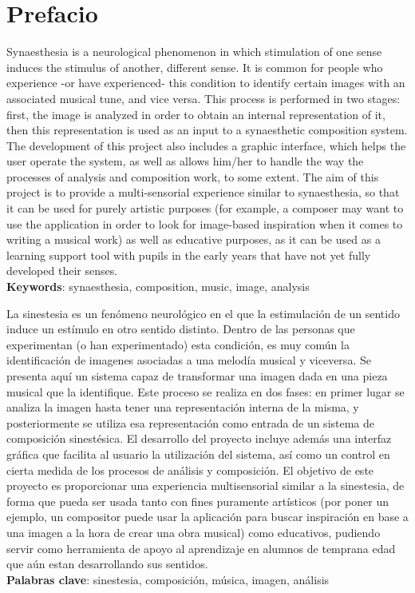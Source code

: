 \chapter*{Prefacio}

\small

Synaesthesia is a neurological phenomenon in which stimulation of one sense induces the stimulus of another, different sense. It is common for people who experience -or have experienced- this condition to identify certain images with an associated musical tune, and vice versa. This process is performed in two stages: first, the image is analyzed in order to obtain an internal representation of it, then this representation is used as an input to a synaesthetic composition system. The development of this project also includes a graphic interface, which helps the user operate the system, as well as allows him/her to handle the way the processes of analysis and composition work, to some extent. The aim of this project is to provide a multi-sensorial experience similar to synaesthesia, so that it can be used for purely artistic purposes (for example, a composer may want to use the application in order to look for image-based inspiration when it comes to writing a musical work) as well as educative purposes, as it can be used as a learning support tool with pupils in the early years that have not yet fully developed their senses.\\

\noindent\textbf{Keywords}: synaesthesia, composition, music, image, analysis\\

\vspace{0.3in}



La sinestesia es un fenómeno neurológico en el que la estimulación de un sentido induce un estímulo en otro sentido distinto. Dentro de las personas que experimentan (o han experimentado) esta condición, es muy común la identificación de imagenes asociadas a una melodía musical y viceversa. Se presenta aquí un sistema capaz de transformar una imagen dada en una pieza musical que la identifique. Este proceso se realiza en dos fases: en primer lugar se analiza la imagen hasta tener una representación interna de la misma, y posteriormente se utiliza esa representación como entrada de un sistema de composición sinestésica. El desarrollo del proyecto incluye además una interfaz gráfica que facilita al usuario la utilización del sistema, así como un control en cierta medida de los procesos de análisis y composición. El objetivo de este proyecto es proporcionar una experiencia multisensorial similar a la sinestesia, de forma que pueda ser usada tanto con fines puramente artísticos (por poner un ejemplo, un compositor puede usar la aplicación para buscar inspiración en base a una imagen a la hora de crear una obra musical) como educativos, pudiendo servir como herramienta de apoyo al aprendizaje en alumnos de temprana edad que aún estan desarrollando sus sentidos.\\


\noindent\textbf{Palabras clave}: sinestesia, composición, música, imagen, análisis\\


\normalsize